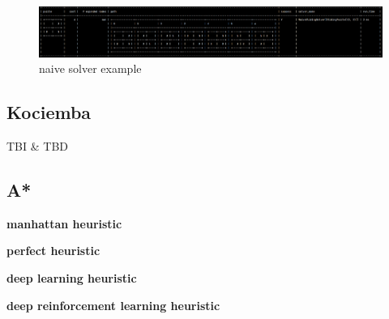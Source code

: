 \begin{figure}[H]
\centering
\includegraphics[scale=0.39]{./Figures/examplenaivesolver}
\caption[Examples]{naive solver example}
\label{fig:examplenaivesolver}
\end{figure}



\subsection{Kociemba}
TBI \& TBD


\subsection{A*}
\label{ASSS}

\textbf{manhattan heuristic}

\textbf{perfect heuristic}

\textbf{deep learning heuristic}

\textbf{deep reinforcement learning heuristic}


